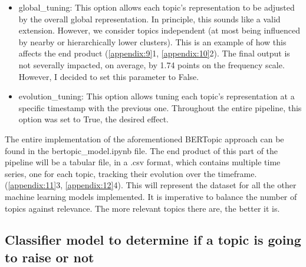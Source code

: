 \documentclass[12pt,MSc,a4paper,oneside]{muthesis}
\begin{document}
    \begin{itemize}
      \item global\_tuning: This option allows each topic's representation to be adjusted by the overall global representation. In principle, this sounds like a valid extension. However, we consider topics independent (at most being influenced by nearby or hierarchically lower clusters). This is an example of how this affects the end product (\ref{appendix:9}1, \ref{appendix:10}2). The final output is not severally impacted, on average, by 1.74 points on the frequency scale. However, I decided to set this parameter to False.
      \item  evolution\_tuning: This option allows tuning each topic's representation at a specific timestamp with the previous one. Throughout the entire pipeline, this option was set to True, the desired effect.
    \end{itemize}

    The entire implementation of the aforementioned BERTopic approach can be found in the bertopic\_model.ipynb file. The end product of this part of the pipeline will be a tabular file, in a .csv format, which contains multiple time series, one for each topic, tracking their evolution over the timeframe. (\ref{appendix:11}3, \ref{appendix:12}4). This will represent the dataset for all the other machine learning models implemented. It is imperative to balance the number of topics against relevance. The more relevant topics there are, the better it is.

    \subsection{Classifier model to determine if a topic is going to raise or not}
\end{document}
